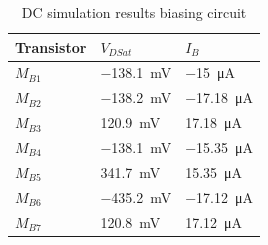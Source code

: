 \begin{table}[H]
    \centering
    \caption{DC simulation results biasing circuit}
    \begin{tabularx}{\textwidth}{>{\centering\arraybackslash}X >{\centering\arraybackslash}X >{\centering\arraybackslash}X}
        \toprule
        \textbf{Transistor} & \textbf{$V_{DSat}$} & \textbf{$I_B$}\\
        \midrule
        $M_{B1}$ & \SI{-138.1}{\milli\volt} & \SI{-15}{\micro\ampere}\\
        \midrule
        $M_{B2}$ & \SI{-138.2}{\milli\volt} & \SI{-17.18}{\micro\ampere}\\
        \midrule
        $M_{B3}$ & \SI{120.9}{\milli\volt} & \SI{17.18}{\micro\ampere}\\
        \midrule
        $M_{B4}$ & \SI{-138.1}{\milli\volt} & \SI{-15.35}{\micro\ampere}\\
        \midrule
        $M_{B5}$ & \SI{341.7}{\milli\volt} & \SI{15.35}{\micro\ampere}\\
        \midrule
        $M_{B6}$ & \SI{-435.2}{\milli\volt} & \SI{-17.12}{\micro\ampere}\\
        \midrule
        $M_{B7}$ & \SI{120.8}{\milli\volt} & \SI{17.12}{\micro\ampere}\\
        \bottomrule
    \end{tabularx}
    \label{tab:DC}
\end{table}

